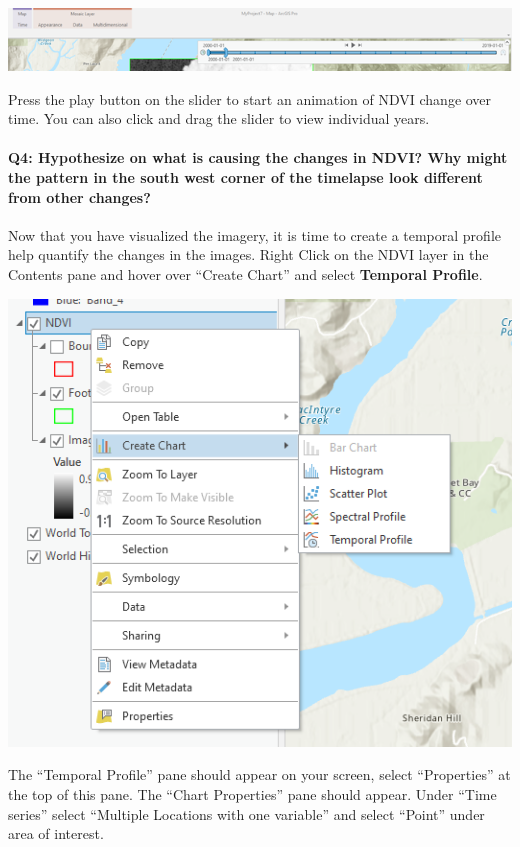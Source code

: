 \documentclass[
]{book}
\begin{document}
\begin{center}\includegraphics[width=1\linewidth]{images/07-slider} \end{center}

Press the play button on the slider to start an animation of NDVI change over time. You can also click and drag the slider to view individual years.

\hypertarget{q4-hypothesize-on-what-is-causing-the-changes-in-ndvi-why-might-the-pattern-in-the-south-west-corner-of-the-timelapse-look-different-from-other-changes}{%
\paragraph*{Q4: Hypothesize on what is causing the changes in NDVI? Why might the pattern in the south west corner of the timelapse look different from other changes?}\label{q4-hypothesize-on-what-is-causing-the-changes-in-ndvi-why-might-the-pattern-in-the-south-west-corner-of-the-timelapse-look-different-from-other-changes}}

Now that you have visualized the imagery, it is time to create a temporal profile help quantify the changes in the images. Right Click on the NDVI layer in the Contents pane and hover over ``Create Chart'' and select \textbf{Temporal Profile}.

\begin{center}\includegraphics[width=0.5\linewidth]{images/07-temporal-profile} \end{center}

The ``Temporal Profile'' pane should appear on your screen, select ``Properties'' at the top of this pane. The ``Chart Properties'' pane should appear. Under ``Time series'' select ``Multiple Locations with one variable'' and select ``Point'' under area of interest.
\end{document}
